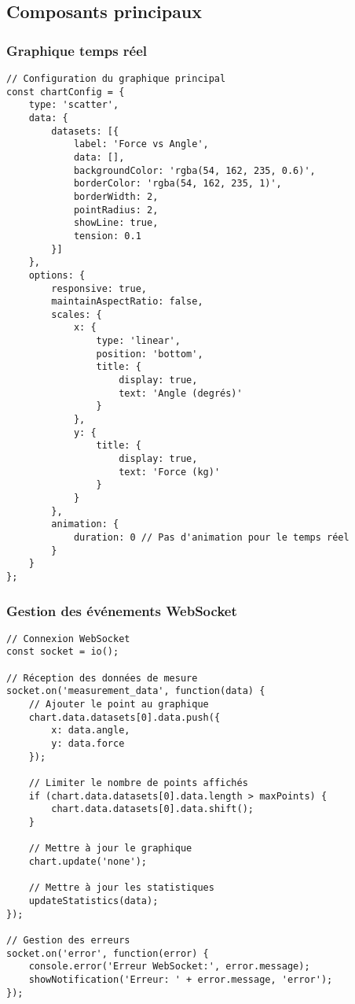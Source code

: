 \documentclass[12pt,a4paper]{article}
\begin{document}
\subsection{Composants principaux}

\subsubsection{Graphique temps réel}

\begin{lstlisting}[caption=Configuration du graphique Chart.js]
// Configuration du graphique principal
const chartConfig = {
    type: 'scatter',
    data: {
        datasets: [{
            label: 'Force vs Angle',
            data: [],
            backgroundColor: 'rgba(54, 162, 235, 0.6)',
            borderColor: 'rgba(54, 162, 235, 1)',
            borderWidth: 2,
            pointRadius: 2,
            showLine: true,
            tension: 0.1
        }]
    },
    options: {
        responsive: true,
        maintainAspectRatio: false,
        scales: {
            x: {
                type: 'linear',
                position: 'bottom',
                title: {
                    display: true,
                    text: 'Angle (degrés)'
                }
            },
            y: {
                title: {
                    display: true,
                    text: 'Force (kg)'
                }
            }
        },
        animation: {
            duration: 0 // Pas d'animation pour le temps réel
        }
    }
};
\end{lstlisting}

\subsubsection{Gestion des événements WebSocket}

\begin{lstlisting}[caption=Gestion des WebSockets côté client]
// Connexion WebSocket
const socket = io();

// Réception des données de mesure
socket.on('measurement_data', function(data) {
    // Ajouter le point au graphique
    chart.data.datasets[0].data.push({
        x: data.angle,
        y: data.force
    });
    
    // Limiter le nombre de points affichés
    if (chart.data.datasets[0].data.length > maxPoints) {
        chart.data.datasets[0].data.shift();
    }
    
    // Mettre à jour le graphique
    chart.update('none');
    
    // Mettre à jour les statistiques
    updateStatistics(data);
});

// Gestion des erreurs
socket.on('error', function(error) {
    console.error('Erreur WebSocket:', error.message);
    showNotification('Erreur: ' + error.message, 'error');
});
\end{lstlisting}
\end{document}
